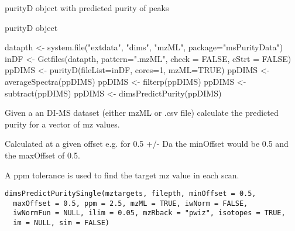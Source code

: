 \documentclass[letterpaper]{book}
\begin{document}
%
\begin{Value}
purityD object with predicted purity of peaks

purityD object
\end{Value}
%
\begin{SeeAlso}\relax
{}
\end{SeeAlso}
%
\begin{Examples}
\begin{ExampleCode}

datapth <- system.file("extdata", "dims", "mzML", package="msPurityData")
inDF <- Getfiles(datapth, pattern=".mzML", check = FALSE, cStrt = FALSE)
ppDIMS <- purityD(fileList=inDF, cores=1, mzML=TRUE)
ppDIMS <- averageSpectra(ppDIMS)
ppDIMS <- filterp(ppDIMS)
ppDIMS <- subtract(ppDIMS)
ppDIMS <- dimsPredictPurity(ppDIMS)
\end{ExampleCode}
\end{Examples}
%
\begin{Description}\relax
Given a an DI-MS dataset (either mzML or .csv file) calculate the predicted
purity for a vector of mz values.

Calculated at a given offset e.g. for 0.5 +/- Da the minOffset would be 0.5
and the maxOffset of 0.5.

A ppm tolerance is used to find the target mz value in each scan.
\end{Description}
%
\begin{Usage}
\begin{verbatim}
dimsPredictPuritySingle(mztargets, filepth, minOffset = 0.5,
  maxOffset = 0.5, ppm = 2.5, mzML = TRUE, iwNorm = FALSE,
  iwNormFun = NULL, ilim = 0.05, mzRback = "pwiz", isotopes = TRUE,
  im = NULL, sim = FALSE)
\end{verbatim}
\end{Usage}
%
\end{document}

